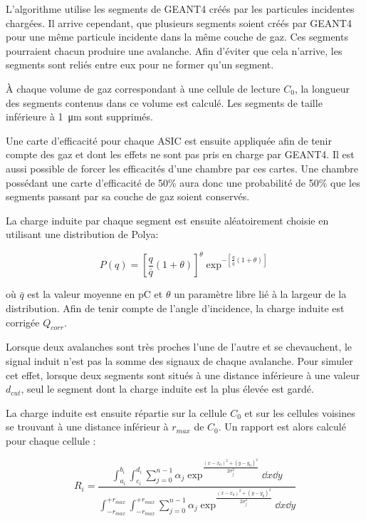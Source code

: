 L'algorithme utilise les segments de GEANT4 créés par les particules incidentes chargées. Il arrive cependant, que plusieurs segments soient créés par GEANT4 pour une même particule incidente dans la même couche de gaz. Ces segments pourraient chacun produire une avalanche. Afin d'éviter que cela n'arrive, les segments sont reliés entre eux pour ne former qu'un segment.

 À chaque volume de gaz correspondant à une cellule de lecture $C_{0}$, la longueur des segments contenus dans ce volume est calculé. Les segments de taille inférieure à \SI{1}{\micro\meter} sont supprimés.
 
 Une carte d'efficacité pour chaque ASIC est ensuite appliquée afin de tenir compte des gaz  et  dont les effets ne sont pas pris en charge par GEANT4. Il est aussi possible de forcer les efficacités d'une chambre par ces cartes. Une chambre possédant une carte d'efficacité de 50\% aura donc une probabilité de 50\% que les segments passant par sa couche de gaz soient conservés.
 
 La charge induite par chaque segment est ensuite aléatoirement choisie en utilisant une distribution de Polya:
 
 \begin{equation}
 P(q)=\left[\frac{q}{\bar{q}}(1+\theta)\right]^\theta\exp^{-\left[\frac{q}{\bar{q}}(1+\theta)\right]}
 \end{equation}
 
 où $\bar{q}$ est la valeur moyenne en \si{\pico\coulomb} et $\theta$ un paramètre libre lié à la largeur de la distribution. Afin de tenir compte de l'angle d'incidence, la charge induite est corrigée $Q_{corr}$.
 
 Lorsque deux avalanches sont très proches l'une de l'autre et se chevauchent, le signal induit n'est pas la somme des signaux de chaque avalanche. Pour simuler cet effet, lorsque deux segments sont situés à une distance inférieure à une valeur $d_{cut}$, seul le segment dont la charge induite est la plus élevée est gardé.
 
 La charge induite est ensuite répartie sur la cellule $C_0$ et sur les cellules voisines se trouvant à une distance inférieur à $r_{max}$ de $C_0$. Un rapport est alors calculé pour chaque cellule :
 
 \begin{equation}
 R_i=\frac{\int_{a_i}^{b_i}\int_{c_i}^{d_i}\sum_{j=0}^{n-1}\alpha_j\exp^{\frac{(x-x_0)^2+(y-y_0)^2}{2\sigma_j^2}}\dd x\dd y}{\int_{-r_{max}}^{+r_{max}}\int_{-r_{max}}^{+r_{max}}\sum_{j=0}^{n-1}\alpha_j\exp^{\frac{(x-x_0)^2+(y-y_0)^2}{2\sigma_j^2}}\dd x\dd y}
 \end{equation}
 
